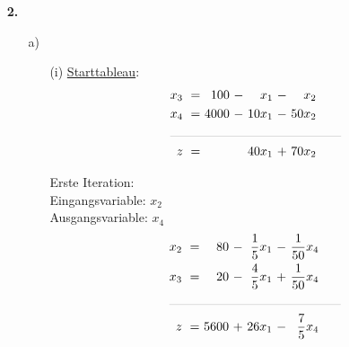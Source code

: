 \documentclass [a4paper,11pt]{article}
\begin{document}
\begin{enumerate}
\begin{enumerate}
        \end{enumerate}

        \item[\textbf{2.}]
            \begin{enumerate}
            \item[a)]
            \begin{enumerate}
                \item[(i)]
                    \underline{Starttableau}:
                    \begin{align*}
                    \begin{alignedat}{6}
                    && x_3 &\ = &\  100 &\ - &\   x_1 &\ - &\   x_2 \\
                    && x_4 &\ = &\ 4000 &\ - &\ 10x_1 &\ - &\ 50x_2 \\
                    &\rlap{\rule{4.8cm}{.1pt}} &&&&&&&\\
                    && z   &\ = &       &    &\ 40x_1 &\ + &\ 70x_2
                    \end{alignedat}
                    \end{align*}

                    Erste Iteration:\\
                    Eingangsvariable: $x_2$\\
                    Ausgangsvariable: $x_4$
                    \begin{align*}
                    \begin{alignedat}{6}
                    && x_2 &\ = &\   80 &\ - &\ \frac{1}{5}x_1 &\ - &\ \frac{1}{50}x_4 \\
                    && x_3 &\ = &\   20 &\ - &\ \frac{4}{5}x_1 &\ + &\ \frac{1}{50}x_4 \\
                    &\rlap{\rule{4.8cm}{.1pt}} &&&&&&&\\
                    && z   &\ = &\ 5600 &\ + &\ 26x_1 &\ - &\ \frac{7}{5}x_4
                    \end{alignedat}
                    \end{align*}


\end{enumerate}
\end{enumerate}
\end{enumerate}
\end{document}
